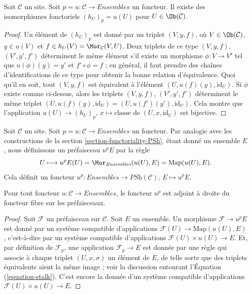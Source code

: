 \begin{lemma}
\label{lemma-points-recover}
Soit $\mathcal{C}$ un site.
Soit $p = u : \mathcal{C} \to \textit{Ensembles}$ un foncteur.
Il existe des isomorphismes fonctoriels $(h_U)_p = u(U)$ pour
$U \in \Ob(\mathcal{C})$.
\end{lemma}

\begin{proof}
Un élément de $(h_U)_p$ est donné par un triplet $(V, y, f)$, où
$V \in \Ob(\mathcal{C})$, $y\in u(V)$ et
$f \in h_U(V) = \Mor_\mathcal{C}(V, U)$.
Deux triplets de ce type $(V, y, f)$, $(V', y', f')$ déterminent le même
élément s’il existe un morphisme $\phi : V \to V'$ tel que
$u(\phi)(y) = y'$ et $f' \circ \phi = f$ ; en général, il faut prendre des
chaînes d’identifications de ce type pour obtenir la bonne relation
d’équivalence. Quoi qu’il en soit, tout $(V, y, f)$ est équivalent à l’élément
$(U, u(f)(y), \text{id}_U)$. Si $\phi$ existe comme ci-dessus, alors les
triplets $(V, y, f)$, $(V', y', f')$ déterminent le même triplet
$(U, u(f)(y), \text{id}_U) = (U, u(f')(y'), \text{id}_U)$.
Cela montre que l’application
$u(U) \to (h_U)_p$, $x \mapsto \text{classe de }(U, x, \text{id}_U)$
est bijective.
\end{proof}

\noindent
Soit $\mathcal{C}$ un site. Soit
$p = u : \mathcal{C} \to \textit{Ensembles}$ un foncteur. Par analogie avec les
constructions de la section \ref{section-functoriality-PSh}, étant donné un
ensemble $E$, nous définissons un préfaisceau $u^pE$ par la règle
\begin{equation}
\label{equation-skyscraper}
U
\longmapsto
u^pE(U) = \Mor_{\textit{Ensembles}}(u(U), E) = \text{Map}(u(U), E).
\end{equation}
Cela définit un foncteur
$u^p : \textit{Ensembles} \to \textit{PSh}(\mathcal{C})$, $E \mapsto u^pE$.

\begin{lemma}
\label{lemma-adjoint-point-push-stalk}
Pour tout foncteur $u : \mathcal{C} \to \textit{Ensembles}$, le foncteur $u^p$ est
adjoint à droite du foncteur fibre sur les préfaisceaux.
\end{lemma}

\begin{proof}
Soit $\mathcal{F}$ un préfaisceau sur $\mathcal{C}$.
Soit $E$ un ensemble. Un morphisme $\mathcal{F} \to u^pE$ est donné par un
système compatible d’applications
$\mathcal{F}(U) \to \text{Map}(u(U), E)$, c’est-à-dire par un système
compatible d’applications $\mathcal{F}(U) \times u(U) \to E$.
Et, par définition de $\mathcal{F}_p$, une application
$\mathcal{F}_p \to E$ est donnée par une règle qui associe à chaque triplet
$(U, x, \sigma)$ un élément de $E$, de telle sorte que des triplets équivalents
aient la même image ; voir la discussion entourant
l’Équation (\ref{equation-stalk}).
C’est encore la donnée d’un système compatible d’applications
$\mathcal{F}(U) \times u(U) \to E$.
\end{proof}

